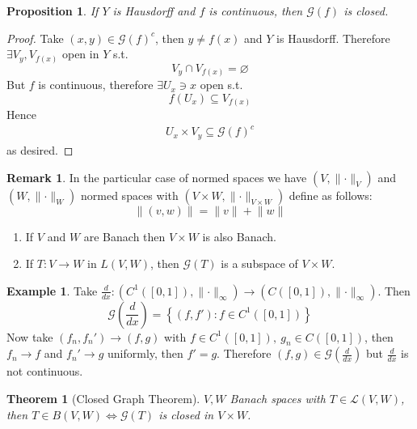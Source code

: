 \documentclass[11pt,a4paper]{article}
\theoremstyle{definition}
\newtheorem{example}[definition]{Example}
\newtheorem{remark}[definition]{Remark}
\theoremstyle{plain}
\newtheorem{theorem}[definition]{Theorem}
\newtheorem{proposition}[definition]{Proposition}
\theoremstyle{remark}
\renewcommand{\set}[1]{\left\{ #1 \right\}}
\newcommand{\norm}[1]{\lVert #1 \rVert}
\newcommand{\1}{\mathbbm{1}}
\begin{document}
\begin{proposition}
    If $Y$ is Hausdorff and $f$ is continuous, then $\mathcal{G}(f)$ is closed. 
\end{proposition}

\begin{proof}
    Take $(x, y) \in \mathcal{G}(f)^c$, then $y \ne f(x)$ and $Y$ is Hausdorff. Therefore $\exists V_y, V_{f(x)}$ open in $Y$ s.t. 
    $$V_y \cap V_{f(x)} = \varnothing$$
    But $f$ is continuous, therefore $\exists U_x \ni x$ open s.t. 
    $$f(U_x) \subseteq V_{f(x)}$$
    Hence 
    \begin{align*}
        U_x \times V_y \subseteq \mathcal{G}(f)^c
    \end{align*}
    as desired.
\end{proof}

\begin{remark}
    In the particular case of normed spaces we have $(V, \norm{\cdot}_V)$ and $(W, \norm{\cdot}_W)$ normed spaces with $(V \times W, \norm{\cdot}_{V \times W})$ define as follows: 
    $$\norm{(v, w)} = \norm{v} + \norm{w}$$
    \begin{enumerate}
        \item If $V$ and $W$ are Banach then $V \times W$ is also Banach. 
        \item If $T \colon V \to W$ in $L(V, W)$, then $\mathcal{G}(T)$ is a subspace of $V \times W$. 
    \end{enumerate}
\end{remark}

\begin{example}
    Take $\frac{d}{dx} \colon (C^1([0,1]), \norm{\cdot}_\infty) \to (C([0,1]), \norm{\cdot}_\infty)$. Then 
    $$\mathcal{G} (\frac{d}{dx}) = \set{(f, f') \colon f \in C^1([0,1])}$$
    Now take $(f_n, f_n') \to (f, g)$ with $f \in C^1([0,1]), \ g_n \in C([0,1])$, then $f_n \to f$ and $f_n' \to g$ uniformly, then $f' = g$. Therefore 
    $(f, g) \in \mathcal{G}(\frac{d}{dx})$ but $\frac{d}{dx}$ is not continuous.
\end{example}

\begin{theorem}[Closed Graph Theorem]
    $V,W$ Banach spaces with $T \in \mathcal{L}(V, W)$, then $T \in B(V, W) \iff \mathcal{G}(T)$ is closed in $V \times W$.
\end{theorem}
\end{document}
